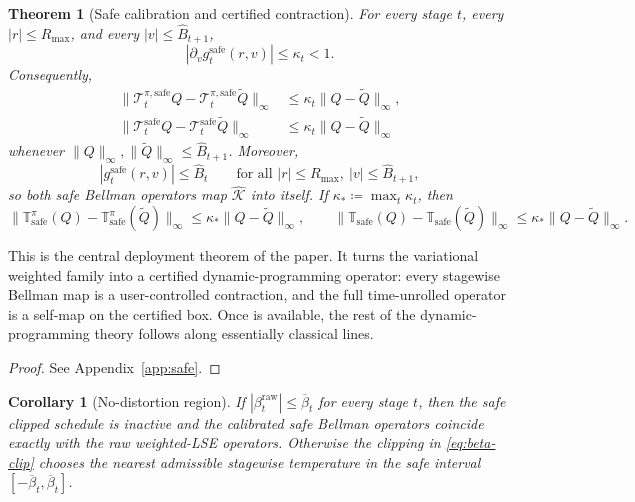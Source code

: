 \documentclass{article}
\newtheorem{theorem}{Theorem}[section]
\newtheorem{corollary}[corollary]{Corollary}
\theoremstyle{remark}
\newcommand{\defeq}{\coloneqq}
\newcommand{\cT}{\mathcal{T}}
\newcommand{\safe}{\mathrm{safe}}
\newcommand{\Ksafe}{\widehat{\mathcal K}}
\newcommand{\betacap}{\overline\beta}
\newcommand{\Bhat}{\widehat B}
\begin{document}
\begin{theorem}[Safe calibration and certified contraction]
\label{thm:safe-calibration}
For every stage $t$, every $|r|\le R_{\max}$, and every $|v|\le \Bhat_{t+1}$,
\begin{equation}
\left|\partial_v g_t^{\safe}(r,v)\right| \le \kappa_t <1.
\label{eq:safe-derivative-bound}
\end{equation}
Consequently,
\begin{align}
\|\cT_t^{\pi,\safe}Q - \cT_t^{\pi,\safe}\widetilde Q\|_\infty
&\le \kappa_t\|Q-\widetilde Q\|_\infty,
\label{eq:safe-policy-contraction}\\
\|\cT_t^{\safe}Q - \cT_t^{\safe}\widetilde Q\|_\infty
&\le \kappa_t\|Q-\widetilde Q\|_\infty
\label{eq:safe-opt-contraction}
\end{align}
whenever $\|Q\|_\infty,\|\widetilde Q\|_\infty\le \Bhat_{t+1}$.
Moreover,
\begin{equation}
|g_t^{\safe}(r,v)| \le \Bhat_t
\qquad \text{for all } |r|\le R_{\max},\ |v|\le \Bhat_{t+1},
\label{eq:safe-range-bound}
\end{equation}
so both safe Bellman operators map $\Ksafe$ into itself.
If $\kappa_*\defeq \max_t \kappa_t$, then
\begin{equation}
\|\mathbb T_\safe^\pi(Q)-\mathbb T_\safe^\pi(\widetilde Q)\|_\infty
\le \kappa_*\|Q-\widetilde Q\|_\infty,
\qquad
\|\mathbb T_\safe(Q)-\mathbb T_\safe(\widetilde Q)\|_\infty
\le \kappa_*\|Q-\widetilde Q\|_\infty.
\label{eq:safe-global-contraction}
\end{equation}
\end{theorem}

This is the central deployment theorem of the paper.
It turns the variational weighted family into a certified dynamic-programming operator: every stagewise Bellman map is a user-controlled contraction, and the full time-unrolled operator is a self-map on the certified box.
Once  is available, the rest of the dynamic-programming theory follows along essentially classical lines.

\begin{proof}
See Appendix~\ref{app:safe}.
\end{proof}

\begin{corollary}[No-distortion region]
\label{cor:no-distortion}
If $|\beta_t^{\mathrm{raw}}|\le \betacap_t$ for every stage $t$, then the safe clipped schedule is inactive and the calibrated safe Bellman operators coincide exactly with the raw weighted-LSE operators.
Otherwise the clipping in \eqref{eq:beta-clip} chooses the nearest admissible stagewise temperature in the safe interval $[-\betacap_t,\betacap_t]$.
\end{corollary}
\end{document}
